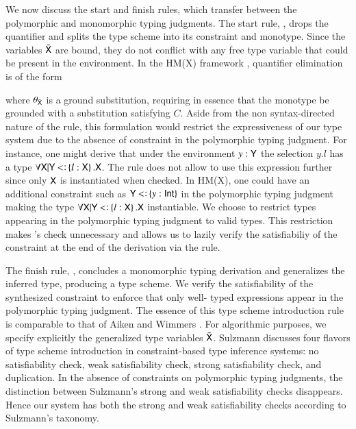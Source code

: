 \documentclass{report}
\begin{document}
  We now discuss the start and finish rules, which transfer between the polymorphic
  and monomorphic typing judgments. The start rule, \sdstart, drops the
  quantifier and splits the type scheme into its constraint and monotype. Since the variables $\bar{\type{X}}$
  are bound, they do not conflict with any free type variable that could be present in
  the environment. In the HM(X) framework \cite{sulzmann97type}, quantifier elimination is of the form
  \begin{mathpar}
  \end{mathpar}
  where $\theta_{\bar{\type{X}}}$ is a ground substitution, requiring in essence that
  the monotype be grounded with a substitution satisfying $C$. Aside from the non syntax-directed
  nature of the rule, this formulation would restrict the expressiveness of our type system
  due to the absence of constraint in the polymorphic typing judgment. For instance, one
  might derive that under the environment $y:\type{Y}$ the selection $y.l$
  has a type $\forall\type{X}|\type{Y}\subtype\set{l:\type{X}}.\type{X}$. The
  \hmxstart rule does not allow to use this expression further since only
  $\type{X}$ is instantiated when checked.
  In HM(X), one could have an additional constraint such as $\type{Y}\subtype\set{y:\Int}$
  in the polymorphic typing judgment making the type
  $\forall\type{X}|\type{Y}\subtype\set{l:\type{X}}.\type{X}$ instantiable.
  We choose to restrict types appearing in the polymorphic typing judgment to valid types.
  This restriction makes \hmxstart's check unnecessary and allows us to lazily
  verify the satisfiabiliy of the constraint at the end of the derivation via the \sdfin rule.
  
  The finish rule, \sdfin, concludes a monomorphic typing    derivation and  generalizes the inferred type,  producing a type scheme. We verify the satisfiability of the    synthesized  constraint to enforce that only well-  typed expressions appear in the polymorphic typing judgment.  
  The essence of this type scheme introduction rule is comparable to    that of Aiken and Wimmers \cite{aiken:ticti}. For algorithmic  purposes, we specify explicitly the generalized type variables $\bar{\type{X}}$.  Sulzmann \cite{sulzmann97type} discusses four flavors of type  scheme introduction in constraint-based type inference systems: no  satisfiability check, weak satisfiability  check, strong satisfiability check, and duplication.  In the absence of constraints on polymorphic typing judgments, the    distinction between Sulzmann's strong and weak satisfiability    checks disappears.  Hence our system has both the strong and weak    satisfiability checks according to Sulzmann's taxonomy.
  
\end{document}
